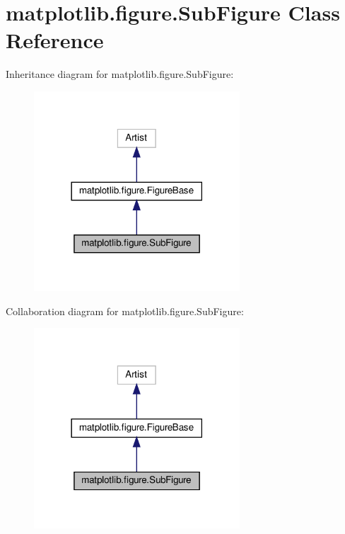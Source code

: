 \hypertarget{classmatplotlib_1_1figure_1_1SubFigure}{}\section{matplotlib.\+figure.\+Sub\+Figure Class Reference}
\label{classmatplotlib_1_1figure_1_1SubFigure}


Inheritance diagram for matplotlib.\+figure.\+Sub\+Figure\+:
\nopagebreak
\begin{figure}[H]
\begin{center}
\leavevmode
\includegraphics[width=218pt]{classmatplotlib_1_1figure_1_1SubFigure__inherit__graph}
\end{center}
\end{figure}


Collaboration diagram for matplotlib.\+figure.\+Sub\+Figure\+:
\nopagebreak
\begin{figure}[H]
\begin{center}
\leavevmode
\includegraphics[width=218pt]{classmatplotlib_1_1figure_1_1SubFigure__coll__graph}
\end{center}
\end{figure}
